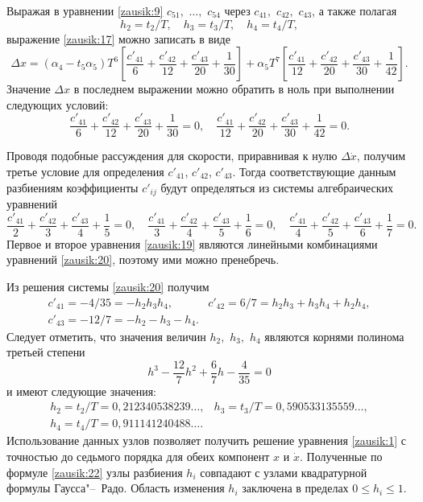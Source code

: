 Выражая в уравнении \eqref{zausik:9} $c_{51},$ $\dots,$ $c_{54}$ через $c_{41},$ $c_{42},$ $c_{43}$, а также полагая
\begin{equation}
h_2={t_2}/{T},\quad 
h_3={t_3}/{T},\quad 
h_4={t_4}/{T},
\label{zausik:18}
\end{equation}
выражение \eqref{zausik:17} можно записать в виде
$$
\Delta x=(\alpha_4-t_5\alpha_5)T^6 \left[ \frac{c'_{41}}{6}+\frac{c'_{42}}{12}+\frac{c'_{43}}{20}+\frac{1}{30}\right]+ \alpha_5 T^7\left[ \frac{c'_{41}}{12}+\frac{c'_{42}}{20}+\frac{c'_{43}}{30}+\frac{1}{42}\right].
$$
Значение $\Delta x$ в последнем выражении можно обратить в ноль при выполнении следующих условий:
\begin{equation}
\frac{c'_{41}}{6}+\frac{c'_{42}}{12}+\frac{c'_{43}}{20}+\frac{1}{30}=0,\quad 
\frac{c'_{41}}{12}+\frac{c'_{42}}{20}+\frac{c'_{43}}{30}+\frac{1}{42}=0.
\label{zausik:19}
\end{equation}

Проводя подобные рассуждения для скорости, приравнивая к нулю $\Delta \dot{x}$, получим третье условие для определения $c'_{41}$, $c'_{42}$, $c'_{43}$. 
Тогда соответствующие данным разбиениям коэффициенты $c'_{ij}$ будут определяться из системы алгебраических уравнений
\begin{equation}
\frac{c'_{41}}{2}+\frac{c'_{42}}{3}+\frac{c'_{43}}{4}+\frac{1}{5}=0,\quad 
\frac{c'_{41}}{3}+\frac{c'_{42}}{4}+\frac{c'_{43}}{5}+\frac{1}{6}=0,\quad 
\frac{c'_{41}}{4}+\frac{c'_{42}}{5}+\frac{c'_{43}}{6}+\frac{1}{7}=0.
\label{zausik:20}
\end{equation}
Первое и второе уравнения \eqref{zausik:19} являются линейными комбинациями уравнений \eqref{zausik:20}, поэтому ими можно пренебречь.

Из решения системы \eqref{zausik:20} получим
\begin{equation}
\begin{array}{ll}
c'_{41}=-{4}/{35}=-h_2 h_3 h_4, & 
c'_{42}={6}/{7}=h_2 h_3 + h_3 h_4+ h_2 h_4, \\
c'_{43}=-{12}/{7}=-h_2-h_3-h_4.
\end{array}
\label{zausik:22}
\end{equation}
Следует отметить, что значения величин $h_2,$ $h_3,$ $h_4$ являются корнями полинома третьей степени
\begin{equation}
h^3-\frac{12}{7}h^2+\frac{6}{7}h-\frac{4}{35}=0
\label{zausik:22}
\end{equation}
и имеют следующие значения:
\begin{equation}
\label{zausik:23}
\begin{array}{ll}
h_2={t_2}/{T}=0,212340538239\dots , &
h_3={t_3}/{T}=0,590533135559\dots , \\
h_4={t_4}/{T}=0,911141240488\dots  .
\end{array}
\end{equation}
Использование данных узлов позволяет получить решение уравнения \eqref{zausik:1} с точностью до седьмого порядка для обеих компонент $x$ и $\dot{x}$. Полученные по формуле \eqref{zausik:22} узлы разбиения $h_i$ совпадают с узлами квадратурной формулы Гаусса"--~Радо. 
Область изменения $h_i$ заключена в пределах $0 \leq h_i \leq1$.

